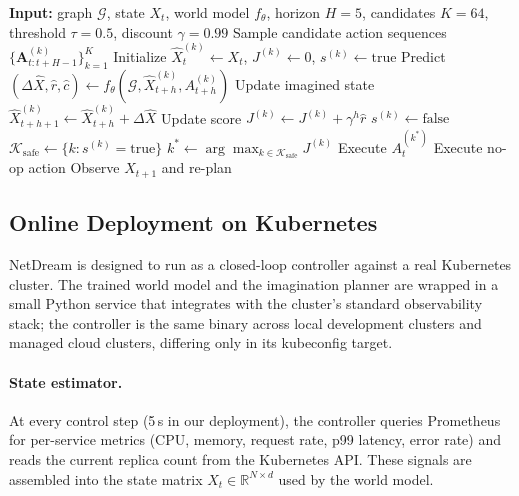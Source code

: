 \begin{algorithm}[t]
\caption{NetDream: Imagination-Based Safe Autoscaling}
\label{alg:netdream}
\begin{algorithmic}[1]
\STATE \textbf{Input:} graph $\mathcal{G}$, state $X_t$, world model
$f_\theta$, horizon $H=5$, candidates $K=64$, threshold $\tau=0.5$,
discount $\gamma=0.99$
\STATE Sample candidate action sequences
$\{\mathbf{A}^{(k)}_{t:t+H-1}\}_{k=1}^{K}$
    \STATE Initialize $\hat{X}^{(k)}_t \leftarrow X_t$,
    $J^{(k)}\leftarrow 0$, $s^{(k)}\leftarrow \mathrm{true}$
        \STATE Predict
        $(\Delta\hat{X},\hat{r},\hat{c})
        \leftarrow
        f_\theta(\mathcal{G},\hat{X}^{(k)}_{t+h},A^{(k)}_{t+h})$
        \STATE Update imagined state
        $\hat{X}^{(k)}_{t+h+1}\leftarrow
        \hat{X}^{(k)}_{t+h}+\Delta\hat{X}$
        \STATE Update score
        $J^{(k)}\leftarrow J^{(k)}+\gamma^h\hat{r}$
            \STATE $s^{(k)}\leftarrow \mathrm{false}$
        \ENDIF
    \ENDFOR
\ENDFOR
\STATE $\mathcal{K}_{\mathrm{safe}}\leftarrow
\{k:s^{(k)}=\mathrm{true}\}$
    \STATE $k^*\leftarrow
    \arg\max_{k\in\mathcal{K}_{\mathrm{safe}}}J^{(k)}$
    \STATE Execute $A^{(k^*)}_t$
\ELSE
    \STATE Execute no-op action
\ENDIF
\STATE Observe $X_{t+1}$ and re-plan
\end{algorithmic}
\end{algorithm}

\subsection{Online Deployment on Kubernetes}
\label{sec:deployment}

NetDream is designed to run as a closed-loop controller against a real
Kubernetes cluster. The trained world model and the imagination planner
are wrapped in a small Python service that integrates with the
cluster's standard observability stack; the controller is the same
binary across local development clusters and managed cloud clusters,
differing only in its kubeconfig target.

\paragraph{State estimator.}
At every control step (5\,s in our deployment), the controller queries
Prometheus for per-service metrics (CPU, memory, request rate, p99
latency, error rate) and reads the current replica count from the
Kubernetes API. These signals are assembled into the state matrix
$X_t\in\mathbb{R}^{N\times d}$ used by the world model.

